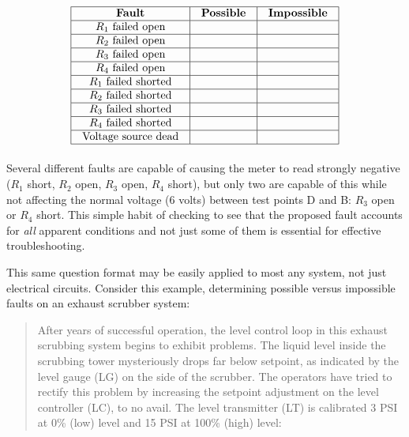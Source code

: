 $$\vbox{\offinterlineskip
\halign{\strut
\vrule \quad\hfil # \ \hfil & 
\vrule \quad\hfil # \ \hfil & 
\vrule \quad\hfil # \ \hfil \vrule \cr
\noalign{\hrule}
%
\textbf{Fault} & \textbf{Possible} & \textbf{Impossible} \cr
%
\noalign{\hrule}
%
$R_1$ failed open &  &  \cr
%
\noalign{\hrule}
%
$R_2$ failed open &  &  \cr
%
\noalign{\hrule}
%
$R_3$ failed open &  &  \cr
%
\noalign{\hrule}
%
$R_4$ failed open &  &  \cr
%
\noalign{\hrule}
%
$R_1$ failed shorted &  &  \cr
%
\noalign{\hrule}
%
$R_2$ failed shorted &  &  \cr
%
\noalign{\hrule}
%
$R_3$ failed shorted &  &  \cr
%
\noalign{\hrule}
%
$R_4$ failed shorted &  &  \cr
%
\noalign{\hrule}
%
Voltage source dead &  &  \cr
%
\noalign{\hrule}
} %
}$$ %

\vskip 10pt

Several different faults are capable of causing the meter to read strongly negative ($R_1$ short, $R_2$ open, $R_3$ open, $R_4$ short), but only two are capable of this while not affecting the normal voltage (6 volts) between test points D and B: $R_3$ open or $R_4$ short.  This simple habit of checking to see that the proposed fault accounts for \textit{all} apparent conditions and not just some of them is essential for effective troubleshooting.

\filbreak

This same question format may be easily applied to most any system, not just electrical circuits.  Consider this example, determining possible versus impossible faults on an exhaust scrubber system:

\vskip 20pt

\begin{quotation}

After years of successful operation, the level control loop in this exhaust scrubbing system begins to exhibit problems.  The liquid level inside the scrubbing tower mysteriously drops far below setpoint, as indicated by the level gauge (LG) on the side of the scrubber.  The operators have tried to rectify this problem by increasing the setpoint adjustment on the level controller (LC), to no avail.  The level transmitter (LT) is calibrated 3 PSI at 0\% (low) level and 15 PSI at 100\% (high) level:

\end{quotation}

